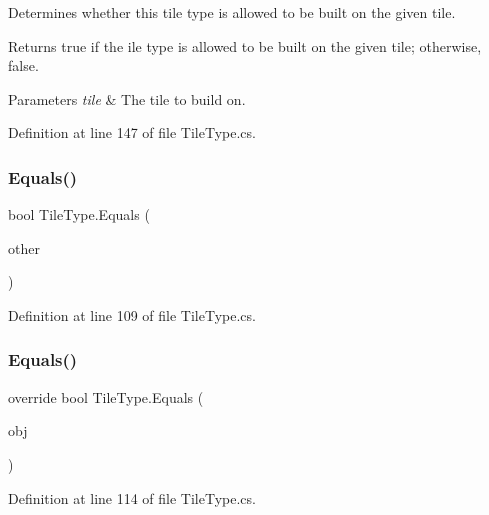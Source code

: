 Determines whether this tile type is allowed to be built on the given tile. 

\begin{DoxyReturn}{Returns}
{\ttfamily true} if the ile type is allowed to be built on the given tile; otherwise, {\ttfamily false}.
\end{DoxyReturn}

\begin{DoxyParams}{Parameters}
{\em tile} & The tile to build on.\\
\hline
\end{DoxyParams}


Definition at line 147 of file Tile\+Type.\+cs.

\mbox{\label{class_tile_type_a64fc9bec84444700962a0e7658a205fa}} 
\subsubsection{\texorpdfstring{Equals()}{Equals()}\hspace{0.1cm}{\footnotesize\ttfamily [1/2]}}
{\footnotesize\ttfamily bool Tile\+Type.\+Equals (\begin{DoxyParamCaption}\item[{\hyperlink{class_tile_type}{Tile\+Type}}]{other }\end{DoxyParamCaption})}



Definition at line 109 of file Tile\+Type.\+cs.

\mbox{\label{class_tile_type_ac39e4bed164069c9dbb5ce5d630bf11a}} 
\subsubsection{\texorpdfstring{Equals()}{Equals()}\hspace{0.1cm}{\footnotesize\ttfamily [2/2]}}
{\footnotesize\ttfamily override bool Tile\+Type.\+Equals (\begin{DoxyParamCaption}\item[{object}]{obj }\end{DoxyParamCaption})}



Definition at line 114 of file Tile\+Type.\+cs.

